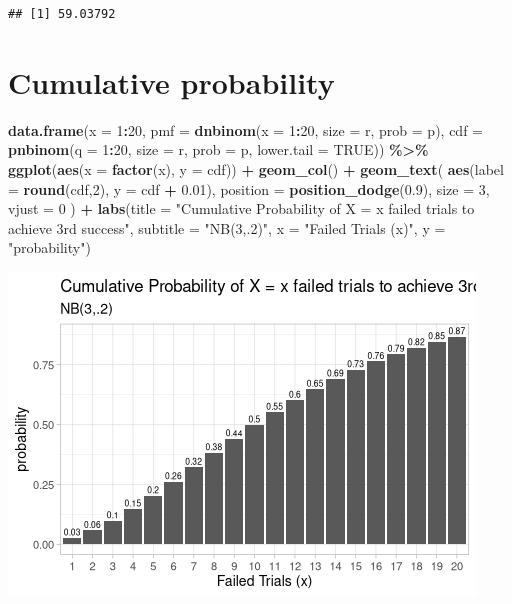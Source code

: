 \documentclass[
  10pt,
]{article}
\newenvironment{Shaded}{\begin{snugshade}}{\end{snugshade}}
\newcommand{\AttributeTok}[1]{\textcolor[rgb]{0.13,0.29,0.53}{#1}}
\newcommand{\ConstantTok}[1]{\textcolor[rgb]{0.56,0.35,0.01}{#1}}
\newcommand{\DecValTok}[1]{\textcolor[rgb]{0.00,0.00,0.81}{#1}}
\newcommand{\FloatTok}[1]{\textcolor[rgb]{0.00,0.00,0.81}{#1}}
\newcommand{\FunctionTok}[1]{\textcolor[rgb]{0.13,0.29,0.53}{\textbf{#1}}}
\newcommand{\NormalTok}[1]{#1}
\newcommand{\SpecialCharTok}[1]{\textcolor[rgb]{0.81,0.36,0.00}{\textbf{#1}}}
\newcommand{\StringTok}[1]{\textcolor[rgb]{0.31,0.60,0.02}{#1}}
\begin{document}
\begin{verbatim}
## [1] 59.03792
\end{verbatim}

\hypertarget{cumulative-probability}{%
\section{Cumulative probability}\label{cumulative-probability}}

\begin{Shaded}
\begin{Highlighting}[]
\FunctionTok{data.frame}\NormalTok{(}\AttributeTok{x =} \DecValTok{1}\SpecialCharTok{:}\DecValTok{20}\NormalTok{, }
           \AttributeTok{pmf =} \FunctionTok{dnbinom}\NormalTok{(}\AttributeTok{x =} \DecValTok{1}\SpecialCharTok{:}\DecValTok{20}\NormalTok{, }\AttributeTok{size =}\NormalTok{ r, }\AttributeTok{prob =}\NormalTok{ p),}
           \AttributeTok{cdf =} \FunctionTok{pnbinom}\NormalTok{(}\AttributeTok{q =} \DecValTok{1}\SpecialCharTok{:}\DecValTok{20}\NormalTok{, }\AttributeTok{size =}\NormalTok{ r, }\AttributeTok{prob =}\NormalTok{ p, }\AttributeTok{lower.tail =} \ConstantTok{TRUE}\NormalTok{)) }\SpecialCharTok{\%\textgreater{}\%}
\FunctionTok{ggplot}\NormalTok{(}\FunctionTok{aes}\NormalTok{(}\AttributeTok{x =} \FunctionTok{factor}\NormalTok{(x), }\AttributeTok{y =}\NormalTok{ cdf)) }\SpecialCharTok{+}
  \FunctionTok{geom\_col}\NormalTok{() }\SpecialCharTok{+}
  \FunctionTok{geom\_text}\NormalTok{(}
    \FunctionTok{aes}\NormalTok{(}\AttributeTok{label =} \FunctionTok{round}\NormalTok{(cdf,}\DecValTok{2}\NormalTok{), }\AttributeTok{y =}\NormalTok{ cdf }\SpecialCharTok{+} \FloatTok{0.01}\NormalTok{),}
    \AttributeTok{position =} \FunctionTok{position\_dodge}\NormalTok{(}\FloatTok{0.9}\NormalTok{),}
    \AttributeTok{size =} \DecValTok{3}\NormalTok{,}
    \AttributeTok{vjust =} \DecValTok{0}
\NormalTok{  ) }\SpecialCharTok{+}
  \FunctionTok{labs}\NormalTok{(}\AttributeTok{title =} \StringTok{"Cumulative Probability of X = x failed trials to achieve 3rd success"}\NormalTok{,}
       \AttributeTok{subtitle =} \StringTok{"NB(3,.2)"}\NormalTok{,}
       \AttributeTok{x =} \StringTok{"Failed Trials (x)"}\NormalTok{,}
       \AttributeTok{y =} \StringTok{"probability"}\NormalTok{) }
\end{Highlighting}
\end{Shaded}

\includegraphics{06.negative_binomial_files/figure-latex/unnamed-chunk-7-1.png}
\end{document}
